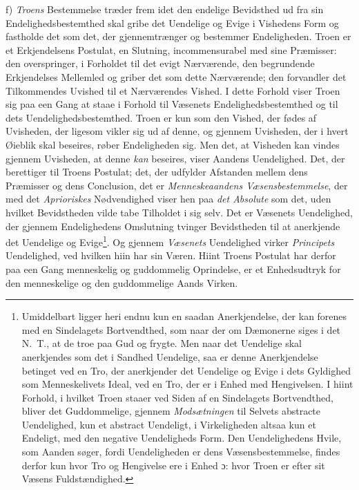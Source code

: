 f) \emph{Troens} Bestemmelse træder frem idet den endelige Bevidsthed ud fra
sin Endelighedsbestemthed skal gribe det Uendelige og Evige i Vishedens Form
og fastholde det som det, der gjennemtrænger og bestemmer Endeligheden. Troen
er et Erkjendelsens Postulat, en Slutning, incommensurabel med sine
Præmisser: den overspringer, i Forholdet til det evigt Nærværende, den
begrundende Erkjendelses Mellemled og griber det som dette Nærværende; den
forvandler det Tilkommendes Uvished til et Nærværendes Vished. I dette Forhold
viser Troen sig paa een Gang at staae i Forhold til Væsenets
Endelighedsbestemthed og til dets Uendelighedsbestemthed. Troen er kun som den
Vished, der fødes af Uvisheden, der ligesom vikler sig ud af denne, og gjennem
Uvisheden, der i hvert Øieblik skal beseires, røber Endeligheden sig. Men det,
at Visheden kan vindes gjennem
 \setcounter{footnote}{0}%
Uvisheden, at denne \emph{kan} beseires, viser Aandens Uendelighed. Det, der
berettiger til Troens Postulat; det, der udfylder Afstanden mellem dens
Præmisser og dens Conclusion, det er \emph{Menneskeaandens
Væsensbestemmelse}, der med det \emph{Aprioriskes} Nødvendighed viser hen paa
\emph{det Absolute} som det, uden hvilket Bevidstheden vilde tabe Tilholdet i
sig selv. Det er Væsenets Uendelighed, der gjennem Endelighedens Omslutning
tvinger Bevidstheden til at anerkjende det Uendelige og
Evige\footnote{Umiddelbart ligger heri endnu kun en saadan Anerkjendelse, der
kan forenes med en Sindelagets Bortvendthed, som naar der om Dæmonerne siges
i det N.\ T., at de troe paa Gud og frygte. Men naar det Uendelige skal
anerkjendes som det i Sandhed Uendelige, saa er denne Anerkjendelse betinget
ved en Tro, der anerkjender det Uendelige og Evige i dets Gyldighed som
Menneskelivets Ideal, ved en Tro, der er i Enhed med Hengivelsen. I hiint
Forhold, i hvilket Troen staaer ved Siden af en Sindelagets Bortvendthed,
bliver det Guddommelige, gjennem \emph{Modsætningen} til Selvets abstracte
Uendelighed, kun et abstract Uendeligt, i Virkeligheden altsaa kun et
Endeligt, med den negative Uendeligheds Form. Den Uendelighedens Hvile, som
Aanden søger, fordi Uendeligheden er dens Væsensbestemmelse, findes derfor kun
hvor Tro og Hengivelse ere i Enhed ɔ: hvor Troen er efter sit Væsens
Fuldstændighed.}. Og gjennem \emph{Væsenets} Uendelighed virker
\emph{Principets} Uendelighed, ved hvilken hiin har sin Væren. Hiint Troens
Postulat har derfor paa een Gang menneskelig og guddommelig Oprindelse, er et
Enhedsudtryk for den menneskelige og den guddommelige Aands Virken.

